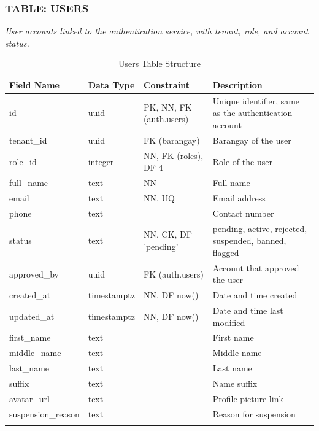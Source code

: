 \subsubsection*{TABLE: USERS}
\noindent\textit{User accounts linked to the authentication service, with tenant, role, and account status.}
\begin{longtable}{|p{3.2cm}|p{2.2cm}|p{3.2cm}|p{5.4cm}|}
\hline
\textbf{Field Name} & \textbf{Data Type} & \textbf{Constraint} & \textbf{Description} \\ \hline
\endhead
\hline \endfoot
\hline \endlastfoot
id & uuid & PK, NN, FK (auth.users) & Unique identifier, same as the authentication account \\ \hline
tenant\_id & uuid & FK (barangay) & Barangay of the user \\ \hline
role\_id & integer & NN, FK (roles), DF 4 & Role of the user \\ \hline
full\_name & text & NN & Full name \\ \hline
email & text & NN, UQ & Email address \\ \hline
phone & text & & Contact number \\ \hline
status & text & NN, CK, DF 'pending' & pending, active, rejected, suspended, banned, flagged \\ \hline
approved\_by & uuid & FK (auth.users) & Account that approved the user \\ \hline
created\_at & timestamptz & NN, DF now() & Date and time created \\ \hline
updated\_at & timestamptz & NN, DF now() & Date and time last modified \\ \hline
first\_name & text & & First name \\ \hline
middle\_name & text & & Middle name \\ \hline
last\_name & text & & Last name \\ \hline
suffix & text & & Name suffix \\ \hline
avatar\_url & text & & Profile picture link \\ \hline
suspension\_reason & text & & Reason for suspension \\ \hline
\caption{Users Table Structure}
\label{tab:users}
\end{longtable}
\vspace{3mm}

